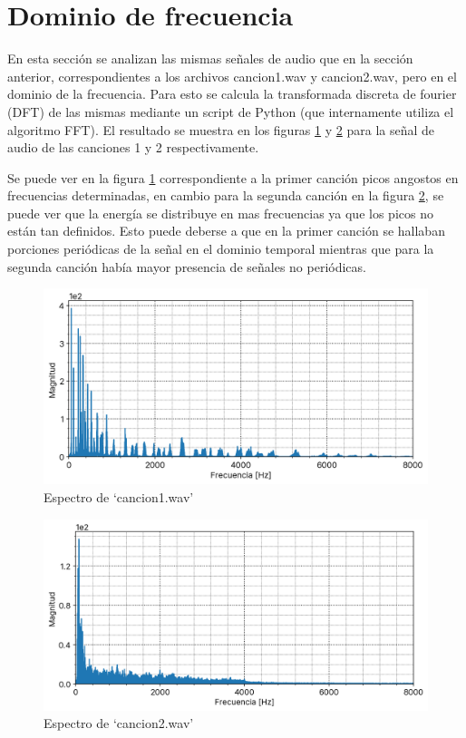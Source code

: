 \documentclass[12pt]{article}
\begin{document}
\pagebreak

\hypertarget{Dominio-de-frecuencia}{%
\section{Dominio de frecuencia}\label{dominio-de-frecuencia}}

En esta sección se analizan las mismas señales de audio que en la
sección anterior, correspondientes a los archivos cancion1.wav y cancion2.wav, pero en el dominio de la frecuencia. Para esto se calcula la
transformada discreta de fourier (DFT) de las mismas mediante un script de
Python (que internamente utiliza el algoritmo FFT). El resultado se muestra en
los figuras \ref{cancion1_fft} y \ref{cancion2_fft} para la señal de audio de
las canciones 1 y 2 respectivamente.

Se puede ver en la figura \ref{cancion1_fft} correspondiente a la primer canción
picos angostos en frecuencias determinadas, en cambio para la segunda canción en
la figura \ref{cancion2_fft}, se puede ver que la energía se distribuye en mas
frecuencias ya que los picos no están tan definidos. Esto puede deberse a que en
la primer canción se hallaban porciones periódicas de la señal en el dominio
temporal mientras que para la segunda canción había mayor presencia de señales
no periódicas.

\begin{figure}[H]
\centering
\includegraphics{plot/cancion1_fft.png}
\caption{Espectro de `cancion1.wav'}
\label{cancion1_fft}
\end{figure}

\begin{figure}[H]
\centering
\includegraphics{plot/cancion2_fft.png}
\caption{Espectro de `cancion2.wav'}
\label{cancion2_fft}
\end{figure}
\end{document}
